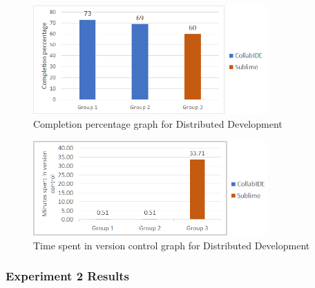 \begin{figure}[htbp]
  \centering
  \includegraphics[width=0.8\textwidth]{img/completionCollaborative}
  \caption{Completion percentage graph for Distributed Development}
  \label{fig:completionCollaborative}
\end{figure}

\begin{figure}[htbp]
  \centering
  \includegraphics[width=0.8\textwidth]{img/versionControlCollaborative}
  \caption{Time spent in version control graph for Distributed Development}
  \label{fig:{img/versionControlCollaborative}}
\end{figure}

\subsubsection{Experiment 2 Results}

